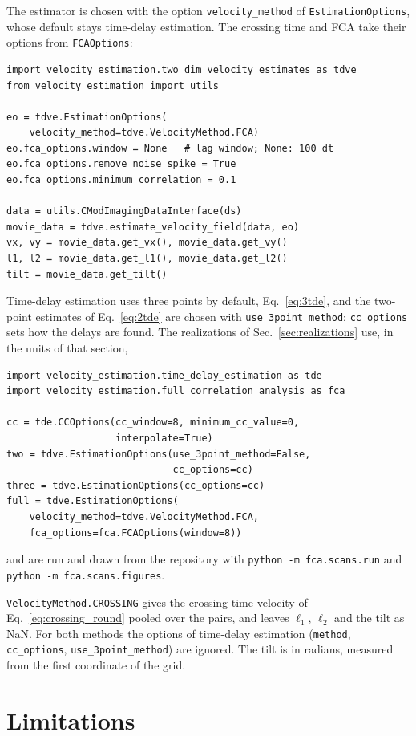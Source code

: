 \documentclass[aps,pre,11pt,a4paper,preprint,amsmath,amssymb,groupedaddress]{revtex4-2}
\newcommand{\Eqref}[1]{Eq.~\eqref{#1}}
\newcommand{\Secref}[1]{Sec.~\ref{#1}}
\newcommand{\code}[1]{\texttt{#1}}
\begin{document}
The estimator is chosen with the option \code{velocity\_method} of \code{EstimationOptions}, whose default stays time-delay estimation. The crossing time and FCA take their options from \code{FCAOptions}:
%
\begin{lstlisting}
import velocity_estimation.two_dim_velocity_estimates as tdve
from velocity_estimation import utils

eo = tdve.EstimationOptions(
    velocity_method=tdve.VelocityMethod.FCA)
eo.fca_options.window = None   # lag window; None: 100 dt
eo.fca_options.remove_noise_spike = True
eo.fca_options.minimum_correlation = 0.1

data = utils.CModImagingDataInterface(ds)
movie_data = tdve.estimate_velocity_field(data, eo)
vx, vy = movie_data.get_vx(), movie_data.get_vy()
l1, l2 = movie_data.get_l1(), movie_data.get_l2()
tilt = movie_data.get_tilt()
\end{lstlisting}
%
Time-delay estimation uses three points by default, \Eqref{eq:3tde}, and the two-point estimates of \Eqref{eq:2tde} are chosen with \code{use\_3point\_method}; \code{cc\_options} sets how the delays are found. The realizations of \Secref{sec:realizations} use, in the units of that section,
%
\begin{lstlisting}
import velocity_estimation.time_delay_estimation as tde
import velocity_estimation.full_correlation_analysis as fca

cc = tde.CCOptions(cc_window=8, minimum_cc_value=0,
                   interpolate=True)
two = tdve.EstimationOptions(use_3point_method=False,
                             cc_options=cc)
three = tdve.EstimationOptions(cc_options=cc)
full = tdve.EstimationOptions(
    velocity_method=tdve.VelocityMethod.FCA,
    fca_options=fca.FCAOptions(window=8))
\end{lstlisting}
%
and are run and drawn from the repository with \code{python -m fca.scans.run} and \code{python -m fca.scans.figures}.

\code{VelocityMethod.CROSSING} gives the crossing-time velocity of \Eqref{eq:crossing_round} pooled over the pairs, and leaves $\ell_1$, $\ell_2$ and the tilt as NaN. For both methods the options of time-delay estimation (\code{method}, \code{cc\_options}, \code{use\_3point\_method}) are ignored. The tilt is in radians, measured from the first coordinate of the grid.

\section{Limitations}
\label{sec:limitations}
\end{document}
